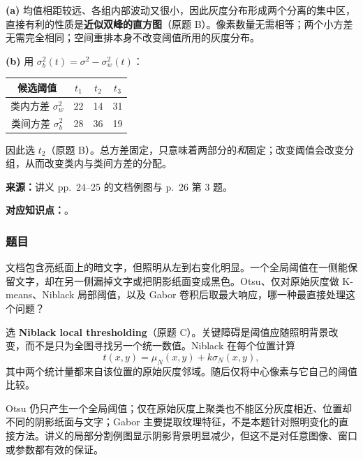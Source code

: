 \begin{checkedsolution}
\textbf{(a)} 均值相距较远、各组内部波动又很小，因此灰度分布形成两个分离的集中区，直接有利的性质是\textbf{近似双峰的直方图}（原题 B）。像素数量无需相等；两个小方差无需完全相同；空间重排本身不改变阈值所用的灰度分布。

\textbf{(b)} 用 $\sigma_b^2(t)=\sigma^2-\sigma_w^2(t)$：
\begin{center}
\begin{tabular}{cccc}
  \toprule
  候选阈值 & $t_1$ & $t_2$ & $t_3$ \\
  \midrule
  类内方差 $\sigma_w^2$ & 22 & 14 & 31 \\
  类间方差 $\sigma_b^2$ & 28 & 36 & 19 \\
  \bottomrule
\end{tabular}
\end{center}
因此选 $t_2$（原题 B）。总方差固定，只意味着两部分的\emph{和}固定；改变阈值会改变分组，从而改变类内与类间方差的分配。
\end{checkedsolution}


\textbf{来源：}讲义 pp.~24--25 的文档例图与 p.~26 第 3 题。

\textbf{对应知识点：}。

\subsubsection*{题目}

文档包含亮纸面上的暗文字，但照明从左到右变化明显。一个全局阈值在一侧能保留文字，却在另一侧漏掉文字或把阴影纸面变成黑色。Otsu、仅对原始灰度做 K-means、Niblack 局部阈值，以及 Gabor 卷积后取最大响应，哪一种最直接处理这个问题？

\begin{checkedsolution}
选 \textbf{Niblack local thresholding}（原题 C）。关键障碍是阈值应随照明背景改变，而不是只为全图寻找另一个统一数值。Niblack 在每个位置计算
\[
  t(x,y)=\mu_N(x,y)+k\sigma_N(x,y),
\]
其中两个统计量都来自该位置的原始灰度邻域。随后仅将中心像素与它自己的阈值比较。

Otsu 仍只产生一个全局阈值；仅在原始灰度上聚类也不能区分灰度相近、位置却不同的阴影纸面与文字；Gabor 主要提取纹理特征，不是本题针对照明变化的直接方法。讲义的局部分割例图显示阴影背景明显减少，但这不是对任意图像、窗口或参数都有效的保证。
\end{checkedsolution}
